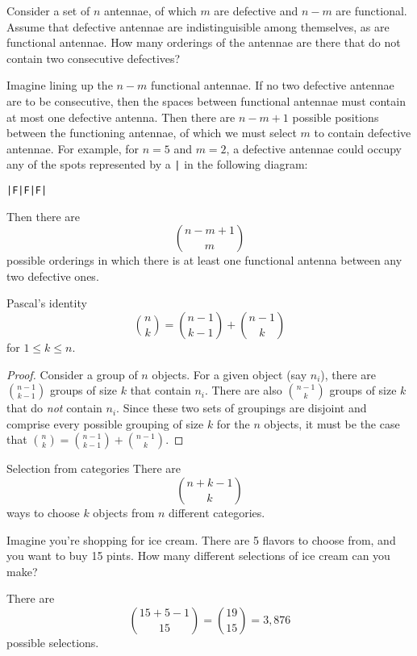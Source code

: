 \begin{changebar}
    \begin{example}
        Consider a set of $n$ antennae, of which $m$ are defective and $n-m$ are functional. Assume that defective antennae are indistinguisible among themselves, as are functional antennae. How many orderings of the antennae are there that do not contain two consecutive defectives?
    \end{example}
    \begin{solution}
        Imagine lining up the $n-m$ functional antennae. If no two defective antennae are to be consecutive, then the spaces between functional antennae must contain at most one defective antenna. Then there are $n-m+1$ possible positions between the functioning antennae, of which we must select $m$ to contain defective antennae. For example, for $n = 5$ and $m = 2$, a defective antennae could occupy any of the spots represented by a \texttt{|} in the following diagram:
        \begin{center}
            \texttt{|F|F|F|}
        \end{center}
        Then there are \[
            {{n-m+1} \choose m}    
            \] possible orderings in which there is at least one functional antenna between any two defective ones. 
        \end{solution}
\end{changebar}
\begin{bdef}{Pascal's identity}\label{pid}
    \[
        {n \choose k} = {{n-1} \choose {k - 1}} + {{n - 1} \choose k}    
    \] for $1 \leq k \leq n$.
\end{bdef}
\begin{proof}
    Consider a group of $n$ objects. For a given object (say $n_i$), there are $\displaystyle {n-1 \choose k-1}$ groups of size $k$ that contain $n_i$. There are also $\displaystyle {n-1 \choose k}$ groups of size $k$ that do \emph{not} contain $n_i$. Since these two sets of groupings are disjoint and comprise every possible grouping of size $k$ for the $n$ objects, it must be the case that $\displaystyle {n \choose k} = {n-1 \choose k-1} + {n-1 \choose k}$.
\end{proof}

\begin{bdef}{Selection from categories}
    There are \[
        {{n+k-1} \choose k}    
    \] ways to choose $k$ objects from $n$ different categories.
\end{bdef}

\begin{changebar}
    \begin{example}
        Imagine you're shopping for ice cream. There are 5 flavors to choose from, and you want to buy 15 pints. How many different selections of ice cream can you make?
    \end{example}
    \begin{solution}
        There are \[
            {{15 + 5 - 1} \choose 15} = {19 \choose 15} = 3{,}876    
            \] possible selections.
        \end{solution}
    \end{changebar}


